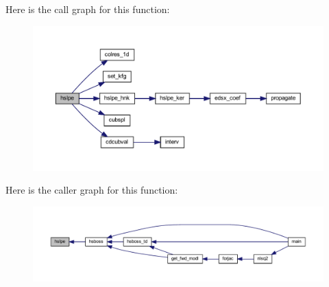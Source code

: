 Here is the call graph for this function\+:\nopagebreak
\begin{figure}[H]
\begin{center}
\leavevmode
\includegraphics[width=350pt]{Leroi_8f90_a918a25836d554d239ee900a00fbefbb6_cgraph}
\end{center}
\end{figure}
Here is the caller graph for this function\+:\nopagebreak
\begin{figure}[H]
\begin{center}
\leavevmode
\includegraphics[width=350pt]{Leroi_8f90_a918a25836d554d239ee900a00fbefbb6_icgraph}
\end{center}
\end{figure}
\mbox{\label{Leroi_8f90_adae61b12e3735bac162cd8f39a3607d3}} 
